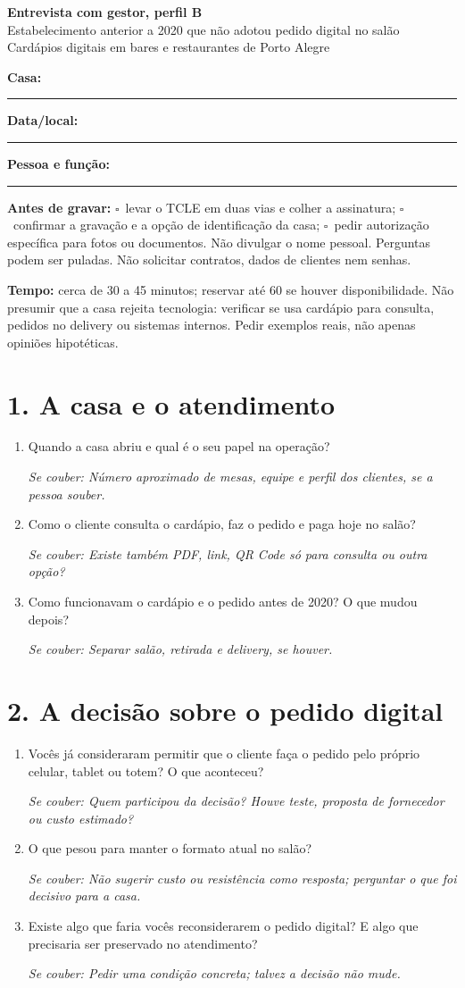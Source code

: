 \documentclass[11pt,a4paper]{article}
\newcommand{\aprofundar}[1]{\par{\small\color{gray}\textit{Se couber: #1}}}
\newcommand{\marcar}{$\square$\ }
\begin{document}
\begin{center}
  {\Large\bfseries Entrevista com gestor, perfil B}\\[0.3em]
  {\small Estabelecimento anterior a 2020 que não adotou pedido digital no salão}\\[0.3em]
  Cardápios digitais em bares e restaurantes de Porto Alegre
\end{center}

\textbf{Casa:} \rule{7cm}{0.4pt}\quad
\textbf{Data/local:} \rule{4cm}{0.4pt}

\textbf{Pessoa e função:} \rule{9cm}{0.4pt}

\textbf{Antes de gravar:} \marcar levar o TCLE em duas vias e colher a assinatura; \marcar confirmar a gravação e a opção de identificação da casa; \marcar pedir autorização específica para fotos ou documentos. Não divulgar o nome pessoal. Perguntas podem ser puladas. Não solicitar contratos, dados de clientes nem senhas.

\textbf{Tempo:} cerca de 30 a 45 minutos; reservar até 60 se houver disponibilidade. Não presumir que a casa rejeita tecnologia: verificar se usa cardápio para consulta, pedidos no delivery ou sistemas internos. Pedir exemplos reais, não apenas opiniões hipotéticas.

\section*{1. A casa e o atendimento}
\begin{enumerate}
  \item Quando a casa abriu e qual é o seu papel na operação?
    \aprofundar{Número aproximado de mesas, equipe e perfil dos clientes, se a pessoa souber.}
  \item Como o cliente consulta o cardápio, faz o pedido e paga hoje no salão?
    \aprofundar{Existe também PDF, link, QR Code só para consulta ou outra opção?}
  \item Como funcionavam o cardápio e o pedido antes de 2020? O que mudou depois?
    \aprofundar{Separar salão, retirada e delivery, se houver.}
\end{enumerate}

\section*{2. A decisão sobre o pedido digital}
\begin{enumerate}[resume]
  \item Vocês já consideraram permitir que o cliente faça o pedido pelo próprio celular, tablet ou totem? O que aconteceu?
    \aprofundar{Quem participou da decisão? Houve teste, proposta de fornecedor ou custo estimado?}
  \item O que pesou para manter o formato atual no salão?
    \aprofundar{Não sugerir custo ou resistência como resposta; perguntar o que foi decisivo para a casa.}
  \item Existe algo que faria vocês reconsiderarem o pedido digital? E algo que precisaria ser preservado no atendimento?
    \aprofundar{Pedir uma condição concreta; talvez a decisão não mude.}
\end{enumerate}
\end{document}
